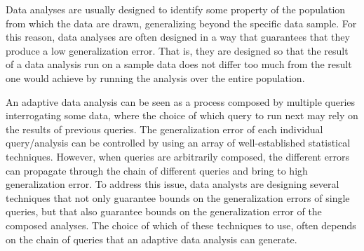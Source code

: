 Data analyses are usually designed to identify some property of the population from which the data are drawn, generalizing beyond the specific data sample. For this reason, data analyses are often designed in a way that guarantees that they produce a low generalization error.
   That is, they are designed so that the result of a data analysis run on a sample data does not differ too much from the result one would achieve by running the analysis over the entire population. 
   
   An adaptive data analysis can be seen as a process composed by multiple queries interrogating some data, where the choice of which query to run next may rely on the results of previous queries. 
   The generalization error of each individual query/analysis can be controlled by using an array of well-established statistical techniques.
   However, when queries are arbitrarily composed, the different errors can propagate through the chain of different queries and bring to high generalization error. 
   To address this issue, data analysts are designing several techniques that not only guarantee bounds on the generalization errors of single queries, but that also guarantee bounds on the generalization error of the composed analyses. 
   The choice of which of these techniques to use, often depends on the chain of queries that an adaptive data analysis can generate.
   
